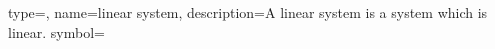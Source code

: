 
{type=\thisgls,
name={linear system},
description={A linear system is a system which is linear.}
symbol={}
}
